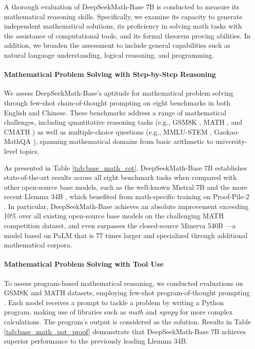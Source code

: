 A thorough evaluation of DeepSeekMath-Base 7B is conducted to measure its mathematical reasoning skills. Specifically, we examine its capacity to generate independent mathematical solutions, its proficiency in solving math tasks with the assistance of computational tools, and its formal theorem proving abilities. In addition, we broaden the assessment to include general capabilities such as natural language understanding, logical reasoning, and programming.

\paragraph{Mathematical Problem Solving with Step-by-Step Reasoning}

We assess DeepSeekMath-Base’s aptitude for mathematical problem solving through few-shot chain-of-thought prompting \citep{cot} on eight benchmarks in both English and Chinese. These benchmarks address a range of mathematical challenges, including quantitative reasoning tasks (e.g., GSM8K \citep{gsm8k}, MATH \citep{MATH}, and CMATH \citep{wei2023cmath}) as well as multiple-choice questions (e.g., MMLU-STEM \citep{mmlu}, Gaokao-MathQA \citep{agieval}), spanning mathematical domains from basic arithmetic to university-level topics.

As presented in Table \ref{tab:base_math_cot}, DeepSeekMath-Base 7B establishes state-of-the-art results across all eight benchmark tasks when compared with other open-source base models, such as the well-known Mistral 7B \citep{mistral} and the more recent Llemma 34B \citep{llemma}, which benefited from math-specific training on Proof-Pile-2 \citep{llemma}. In particular, DeepSeekMath-Base achieves an absolute improvement exceeding 10\% over all existing open-source base models on the challenging MATH competition dataset, and even surpasses the closed-source Minerva 540B \citep{minerva}—a model based on PaLM \citep{palm} that is 77 times larger and specialized through additional mathematical corpora.

\paragraph{Mathematical Problem Solving with Tool Use} To assess program-based mathematical reasoning, we conducted evaluations on GSM8K and MATH datasets, employing few-shot program-of-thought prompting \citep{pot,pal}. Each model receives a prompt to tackle a problem by writing a Python program, making use of libraries such as \textit{math} and \textit{sympy} for more complex calculations. The program’s output is considered as the solution. Results in Table \ref{tab:base_math_pot_proof} demonstrate that DeepSeekMath-Base 7B achieves superior performance to the previously leading Llemma 34B.

